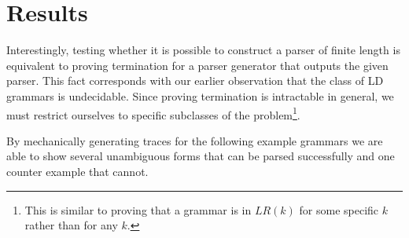 \documentclass[envcountsame,runningheads]{llncs}
\begin{document}
\section{Results}

Interestingly, testing whether it is possible to construct a parser of finite length is equivalent to proving termination for a parser generator that outputs the given parser.
This fact corresponds with our earlier observation that the class of LD grammars is undecidable.
Since proving termination is intractable in general, we must restrict ourselves to specific subclasses of the problem\footnote{This is similar to proving that a grammar is in $LR(k)$ for some specific $k$ rather than for any $k$.}.


By mechanically generating traces for the following example grammars we are able to show several unambiguous forms that can be parsed successfully and one counter example that cannot.
\end{document}

